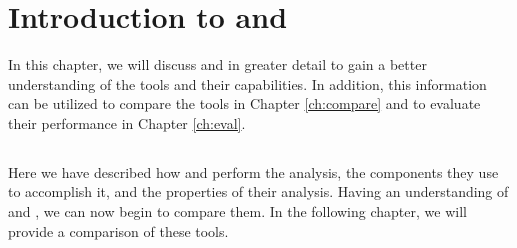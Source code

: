 \chapter{Introduction to \cognicryptsast{} and \codyze}
\label{ch:intro}
In this chapter, we will discuss \cognicryptsast{} and \codyze{} in greater detail to gain a better understanding of the tools and their capabilities. In addition, this information can be utilized to compare the tools in Chapter \ref{ch:compare} and to evaluate their performance in Chapter \ref{ch:eval}.

\section{\cognicryptsast}

\label{sec:cc}

\section{\codyze}

\label{sec:codyze}

\setlength{\parindent}{0em}
\setlength{\parskip}{2em}
\par
Here we have described how \cognicryptsast{} and \codyze{} perform the analysis, the components they use to accomplish it, and the properties of their analysis. Having an understanding of \codyze{} and \cognicryptsast, we can now begin to compare them. In the following chapter, we will provide a comparison of these tools.

